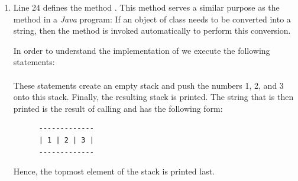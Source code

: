 \begin{enumerate}
      Note that in order to create a copy $C$ of a stack object $S$ it is not sufficient to use the assignment statement
      \\[0.2cm]
      \hspace*{1.3cm}
      $C = S$
      \\[0.2cm]
      because after this statement $C$ is merely a new  to the stack object $S$.  Hence changing $C$
      would also change $S$ and vice versa.  For example, the method call
      \\[0.2cm]
      \hspace*{1.3cm}
      $C.\mytt{pop}()$
      \\[0.2cm]
      would then also pop the stack $S$ and similarly the statement
      \\[0.2cm]
      \hspace*{1.3cm}
      $S.\mytt{push}(x)$
      \\[0.2cm]
      would push $x$ onto the stack $C$.  Since this is usually not what we want, we have to invoke the method
       as 
      \\[0.2cm]
      \hspace*{1.3cm}
      $C = S.\mytt{copy}()$
      \\[0.2cm]
      in order to create a copy of the stack $S$.
\item Line 24 defines the method .  This method serves a similar purpose as the method
       in a \textsl{Java} program:  If an object of class  needs to
      be converted into a string, then the method  is invoked automatically to
      perform this conversion.

      In order to understand the implementation of  we execute the following statements:
      \\[0.2cm]
      \hspace*{1.3cm}
      \\[0.2cm]
      These statements create an empty stack and push the numbers 1, 2, and 3 
      onto this stack.  Finally, the resulting stack is printed.  The string that is then printed
      is the result of calling  and has the following form:
      \begin{verbatim}
      -------------
      | 1 | 2 | 3 |
      -------------
      \end{verbatim}
      \vspace*{-0.5cm}
      Hence, the topmost element of the stack is printed last.


\end{enumerate}
